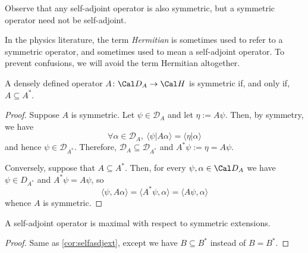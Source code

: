 \begin{remark}
Observe that any self-adjoint operator is also symmetric, but a
symmetric operator need not be self-adjoint. 

In the physics literature, the term \emph{Hermitian} is sometimes used to refer to a symmetric operator, and
sometimes used to mean a self-adjoint operator.
To prevent confusions, we will avoid the term Hermitian altogether.
\end{remark}


\begin{proposition}
  \label{prp:symext}
  A densely defined operator $A\colon\Cal D_A\to\Cal H$ is symmetric
  if, and only if, $A\subseteq A^*$.
\end{proposition}
\begin{proof}
  Suppose \(A\) is symmetric.
  Let $\psi\in\mathcal{D}_A$ and let $\eta:=A\psi$. Then, by symmetry, we have
  \begin{equation*}
    \forall \alpha\in \mathcal{D}_A, \
    \langle\psi|A\alpha\rangle = \langle \eta|\alpha\rangle
  \end{equation*}
  and hence $\psi\in\mathcal{D}_{A^*}$. Therefore,
  $\mathcal{D}_A\subseteq \mathcal{D}_{A^*}$ and $A^*\psi:=\eta =
  A\psi$.
  
  Conversely, suppose that \(A\subseteq A^*\). Then, for every
  \(\psi,\alpha\in\Cal D_A\) we have \(\psi\in D_{A^*}\) and
  \(A^*\psi=A\psi\), so
  \begin{equation}
    \langle \psi,A\alpha\rangle
    = \langle A^*\psi,\alpha\rangle
    = \langle A\psi,\alpha\rangle
  \end{equation}
  whence \(A\) is symmetric.
\end{proof}

\begin{corollary}
  A self-adjoint operator is maximal with respect to symmetric extensions.
\end{corollary}
\begin{proof}
  Same as \cref{cor:selfasdjext}, except we have \(B\subseteq B^*\)
  instead of \(B=B^*\).
\end{proof}

